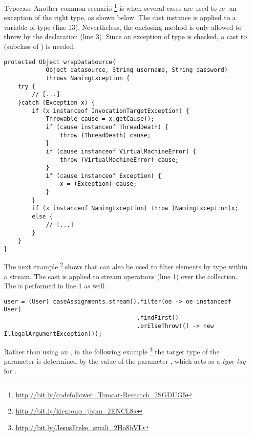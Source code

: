 \begin{pattern}{Typecase}
Another common scenario%
\footnote{\url{http://bit.ly/codefollower_Tomcat-Research_2SGDUG5}}
is when several cases are used to re- an exception of the right type, as shown below.
The cast instance is applied to a variable of type 
(line 13).
Nevertheless, the enclosing method is only allowed to throw  by the  declaration (line 3).
Since an exception of type  is checked,
a cast to  (subclass of ) is needed.

\begin{verbatim}
protected Object wrapDataSource(
			Object datasource, String username, String password)
			throws NamingException {
	try {
		// [...]
	}catch (Exception x) {
		if (x instanceof InvocationTargetException) {
			Throwable cause = x.getCause();
			if (cause instanceof ThreadDeath) {
				throw (ThreadDeath) cause;
			}
			if (cause instanceof VirtualMachineError) {
				throw (VirtualMachineError) cause;
			}
			if (cause instanceof Exception) {
				x = (Exception) cause;
			}
		}
		if (x instanceof NamingException) throw (NamingException)x;
		else {
			// [...]
		}
	}
}
\end{verbatim}

The next example%
\footnote{\url{http://bit.ly/kiegroup_jbpm_2ENCL8a}}
shows that
\thisp{} can also be used to filter elements by type within a stream.
The cast is applied to stream operations (line 1) over the  collection.
The  is performed in line 1 as well.

\begin{verbatim}
user = (User) caseAssignments.stream().filter(oe -> oe instanceof User)
                                      .findFirst()
                                      .orElseThrow(() -> new IllegalArgumentException());
\end{verbatim}

Rather than using an ,
in the following example%
\footnote{\url{http://bit.ly/JesusFreke_smali_2Ho8bVL}}
the target type of the parameter  is determined by the value
of the parameter ,
which acts as a \emph{type tag} for .


\end{pattern}
